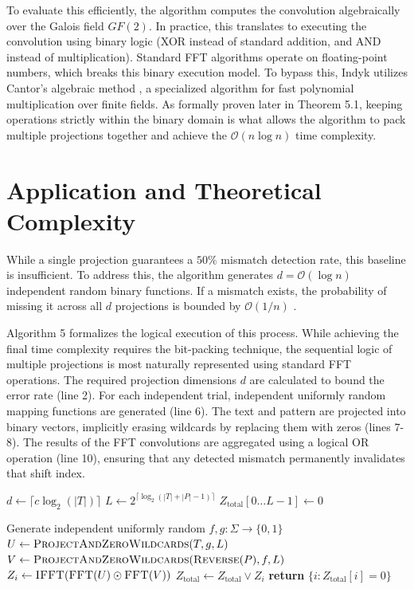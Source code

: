 To evaluate this efficiently, the algorithm computes the convolution algebraically over the Galois field $GF(2)$. In practice, this translates to executing the convolution using binary logic (XOR instead of standard addition, and AND instead of multiplication). Standard FFT algorithms operate on floating-point numbers, which breaks this binary execution model. To bypass this, Indyk utilizes Cantor's algebraic method \cite{cantor1989}, a specialized algorithm for fast polynomial multiplication over finite fields. As formally proven later in Theorem 5.1, keeping operations strictly within the binary domain is what allows the algorithm to pack multiple projections together and achieve the $\mathcal{O}(n \log n)$ time complexity.

\section{Application and Theoretical Complexity}
While a single projection guarantees a $50\%$ mismatch detection rate, this baseline is insufficient. To address this, the algorithm generates $d = \mathcal{O}(\log n)$ independent random binary functions. If a mismatch exists, the probability of missing it across all $d$ projections is bounded by $\mathcal{O}(1/n)$ \cite{indyk1998}.

Algorithm 5 formalizes the logical execution of this process. While achieving the final time complexity requires the bit-packing technique, the sequential logic of multiple projections is most naturally represented using standard FFT operations. The required projection dimensions $d$ are calculated to bound the error rate (line 2). For each independent trial, independent uniformly random mapping functions are generated (line 6). The text and pattern are projected into binary vectors, implicitly erasing wildcards by replacing them with zeros (lines 7-8). The results of the FFT convolutions are aggregated using a logical OR operation (line 10), ensuring that any detected mismatch permanently invalidates that shift index.

\begin{algorithm}[H]
\caption{Indyk Randomized Binary Projections}
\begin{algorithmic}[1]
    \State $d \gets \lceil c \log_2(|T|) \rceil$ 
    \State $L \gets 2^{\lceil \log_2(|T| + |P| - 1) \rceil}$
    \State $Z_{\text{total}}[0 \dots L-1] \gets 0$
    
        \State Generate independent uniformly random $f, g: \Sigma \to \{0, 1\}$
        \State $U \gets \text{\textsc{ProjectAndZeroWildcards}}(T, g, L)$
        \State $V \gets \text{\textsc{ProjectAndZeroWildcards}}(\text{\textsc{Reverse}}(P), f, L)$
        \State $Z_i \gets \text{\textsc{IFFT}}(\text{\textsc{FFT}}(U) \odot \text{\textsc{FFT}}(V))$
        \State $Z_{\text{total}} \gets Z_{\text{total}} \lor Z_i$ 
    \EndFor
    \State \textbf{return} $\{i \colon Z_{\text{total}}[i] = 0\}$
\EndFunction
\end{algorithmic}
\end{algorithm}

